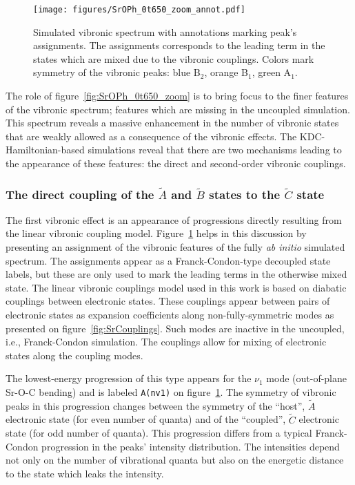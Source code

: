 \documentclass{article}
\begin{document}
\begin{figure}
    \begin{center}
        \texttt{[image: figures/SrOPh\_0t650\_zoom\_annot.pdf]}
    \end{center}
    \caption{
        Simulated vibronic spectrum with annotations marking peak's
        assignments. The assignments corresponds to the leading term in the
        states which are mixed due to the vibronic couplings. Colors mark
        symmetry of the vibronic peaks: blue B$_2$, orange B$_1$, green A$_1$.
    }
    \label{fig:SrOPh_0t650_assigned}
\end{figure}

The role of figure~\ref{fig:SrOPh_0t650_zoom} is to bring focus to the finer
features of the vibronic spectrum; features which are missing in the uncoupled
simulation. This spectrum reveals a massive enhancement in the number of
vibronic states that are weakly allowed as a consequence of the vibronic
effects. The KDC-Hamiltonian-based simulations reveal that there are two
mechanisms leading to the appearance of these features: the direct and
second-order vibronic couplings.

\subsubsection{The direct coupling of the $\tilde{A}$ and $\tilde{B}$ states to
the $\tilde{C}$ state} 
\label{sec:results:simulations:linear}

The first vibronic effect is an appearance of progressions directly resulting
from the linear vibronic coupling model. Figure~\ref{fig:SrOPh_0t650_assigned}
helps in this discussion by presenting an assignment of the vibronic features
of the fully \emph{ab initio} simulated spectrum. The assignments appear as a
Franck-Condon-type decoupled state labels, but these are only used to mark the
leading terms in the otherwise mixed state. The linear vibronic couplings model
used in this work is based on diabatic couplings between electronic states.
These couplings appear between pairs of electronic states as expansion
coefficients along non-fully-symmetric modes as presented on
figure~\ref{fig:SrCouplings}. Such modes are inactive in the uncoupled, i.e.,
Franck-Condon simulation. The couplings allow for mixing of electronic states
along the coupling modes. 

The lowest-energy progression of this type appears for the $\nu _1$ mode
(out-of-plane Sr-O-C bending) and is labeled \texttt{A(nv1)} on
figure~\ref{fig:SrOPh_0t650_assigned}. The symmetry of vibronic peaks in this
progression changes between the symmetry of the ``host'', $\tilde{A}$
electronic state (for even number of quanta) and of the ``coupled'',
$\tilde{C}$ electronic state (for odd number of quanta). This progression
differs from a typical Franck-Condon progression in the peaks' intensity
distribution. The intensities depend not only on the number of vibrational
quanta but also on the energetic distance to the state which leaks the
intensity.
\end{document}

